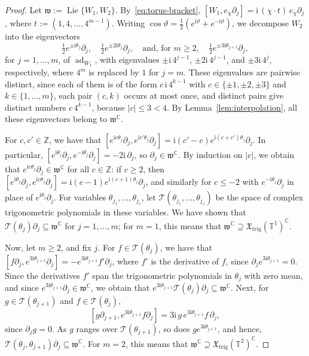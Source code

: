 \documentclass{article}
\newcommand{\C}{\mathbb{C}}
\newcommand{\Z}{\mathbb{Z}}
\newcommand{\T}{\mathbb{T}}
\newcommand{\frakw}{\mathfrak{w}}
\newcommand{\xtrig}{\mathfrak X_{\mathrm{trig}}}
\theoremstyle{definition}
\theoremstyle{plain}
\begin{document}
\begin{proof}
Let $\frakw:=\operatorname{Lie}\{W_1,W_2\}$.
By~\eqref{eq:torus-bracket}, $[W_1,e_\chi \partial_j]=\mathrm{i}\,(\chi\cdot t)\,e_\chi \partial_j$, where $t:=(1,4,\ldots,4^{m-1})$.
Writing $\cos\vartheta=\frac12(e^{\mathrm{i}\vartheta}+e^{-\mathrm{i}\vartheta})$, we decompose $W_2$ into the eigenvectors
$$
\tfrac12 e^{\pm\mathrm{i}\theta_j}\partial_j, \quad \tfrac12 e^{\pm2\mathrm{i}\theta_j}\partial_j, \quad\mbox{and, for  } m\geq2,\quad\tfrac12 e^{\pm3\mathrm{i}\theta_{j+1}}\partial_j,
$$
for $j=1,\ldots,m$, of $\operatorname{ad}_{W_1}$, with eigenvalues $\pm\mathrm{i}\,4^{j-1}$, $\pm2\mathrm{i}\,4^{j-1}$, and $\pm3\mathrm{i}\,4^{j}$, respectively, where $4^m$ is replaced by $1$ for $j=m$.
These eigenvalues are pairwise distinct, since each of them is of the form $c\,\mathrm{i}\,4^{k-1}$ with $c\in\{\pm1,\pm2,\pm3\}$ and $k\in\{1,\ldots,m\}$, each pair $(c,k)$ occurs at most once, and distinct pairs give distinct numbers $c\,4^{k-1}$, because $|c|\leq3<4$.
By Lemma~\ref{lem:interpolation}, all these eigenvectors belong to $\frakw^\C$.

For $c,c'\in\Z$, we have that $[e^{\mathrm{i}c\theta_j}\partial_j,e^{\mathrm{i}c'\theta_j}\partial_j]=\mathrm{i}(c'-c)e^{\mathrm{i}(c+c')\theta_j}\partial_j$.
In particular, $[e^{\mathrm{i}\theta_j}\partial_j,e^{-\mathrm{i}\theta_j}\partial_j]=-2\mathrm{i}\,\partial_j$, so $\partial_j\in\frakw^\C$.
By induction on $|c|$, we obtain that $e^{\mathrm{i}c\theta_j}\partial_j\in\frakw^\C$ for all $c\in\Z$: if $c\geq2$, then $[e^{\mathrm{i}\theta_j}\partial_j,e^{\mathrm{i}c\theta_j}\partial_j]=\mathrm{i}(c-1)e^{\mathrm{i}(c+1)\theta_j}\partial_j$,
and similarly for $c\leq-2$ with $e^{-\mathrm{i}\theta_j}\partial_j$ in place of $e^{\mathrm{i}\theta_j}\partial_j$.
For variables $\theta_{j_1},\ldots,\theta_{j_s}$, let $\mathcal T(\theta_{j_1},\ldots,\theta_{j_s})$ be the space of complex trigonometric polynomials in these variables.
 We have shown that $\mathcal T(\theta_j)\partial_j\subseteq\frakw^\C$ for $j=1,\ldots,m$; for $m=1$, this means that $\frakw^\C\supseteq\xtrig(\T^1)^\C$.

Now, let $m\geq2$, and fix $j$.
For $f\in\mathcal T(\theta_j)$, we have that $[f\partial_j,e^{3\mathrm{i}\theta_{j+1}}\partial_j]=-e^{3\mathrm{i}\theta_{j+1}}f'\partial_j$, where $f'$ is the derivative of $f$, since $\partial_je^{3\mathrm{i}\theta_{j+1}}=0$. Since the derivatives $f'$ span the trigonometric polynomials in $\theta_j$ with zero mean,
  and since $e^{3\mathrm{i}\theta_{j+1}}\partial_j\in\frakw^\C$, we obtain that $e^{3\mathrm{i}\theta_{j+1}}\mathcal T(\theta_j)\partial_j\subseteq\frakw^\C$.
Next, for $g\in\mathcal T(\theta_{j+1})$ and $f\in\mathcal T(\theta_j)$,
$$
  [g\partial_{j+1},e^{3\mathrm{i}\theta_{j+1}}f\partial_j]=3\mathrm{i}\,g\,e^{3\mathrm{i}\theta_{j+1}}f\,\partial_j,
$$
since $\partial_jg=0$. As $g$ ranges over $\mathcal T(\theta_{j+1})$, so does $ge^{3\mathrm{i}\theta_{j+1}}$, and hence, $\mathcal T(\theta_j,\theta_{j+1})\partial_j\subseteq\frakw^\C$.
 For $m=2$, this means that $\frakw^\C\supseteq\xtrig(\T^2)^\C$.


\end{proof}
\end{document}

